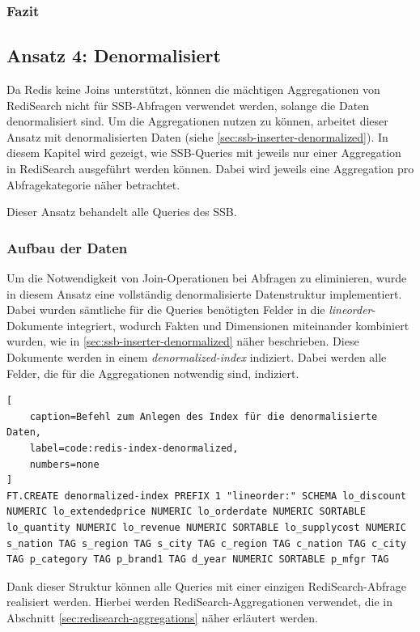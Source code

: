 \subsubsection{Fazit}


\subsection{Ansatz 4: Denormalisiert}
Da Redis keine Joins unterstützt, können die mächtigen Aggregationen von RediSearch nicht für SSB-Abfragen verwendet werden, solange die Daten denormalisiert sind. Um die Aggregationen nutzen zu können, arbeitet dieser Ansatz mit denormalisierten Daten (siehe \cref{sec:ssb-inserter-denormalized}).
In diesem Kapitel wird gezeigt, wie SSB-Queries mit jeweils nur einer Aggregation in RediSearch ausgeführt werden können. Dabei wird jeweils eine Aggregation pro Abfragekategorie näher betrachtet.

Dieser Ansatz behandelt alle Queries des SSB.

\subsubsection{Aufbau der Daten}
Um die Notwendigkeit von Join-Operationen bei Abfragen zu eliminieren, wurde in diesem Ansatz eine vollständig denormalisierte Datenstruktur implementiert. Dabei wurden sämtliche für die Queries benötigten Felder in die \emph{lineorder}-Dokumente integriert, wodurch Fakten und Dimensionen miteinander kombiniert wurden, wie in \cref{sec:ssb-inserter-denormalized} näher beschrieben. Diese Dokumente werden in einem \emph{denormalized-index} indiziert. Dabei werden alle Felder, die für die Aggregationen notwendig sind, indiziert.

\begin{lstlisting}[
    caption=Befehl zum Anlegen des Index für die denormalisierte Daten,
    label=code:redis-index-denormalized,
    numbers=none
]
FT.CREATE denormalized-index PREFIX 1 "lineorder:" SCHEMA lo_discount NUMERIC lo_extendedprice NUMERIC lo_orderdate NUMERIC SORTABLE lo_quantity NUMERIC lo_revenue NUMERIC SORTABLE lo_supplycost NUMERIC s_nation TAG s_region TAG s_city TAG c_region TAG c_nation TAG c_city TAG p_category TAG p_brand1 TAG d_year NUMERIC SORTABLE p_mfgr TAG
\end{lstlisting}



Dank dieser Struktur können alle Queries mit einer einzigen RediSearch-Abfrage realisiert werden. Hierbei werden RediSearch-Aggregationen verwendet, die in Abschnitt \ref{sec:redisearch-aggregations} näher erläutert werden.



